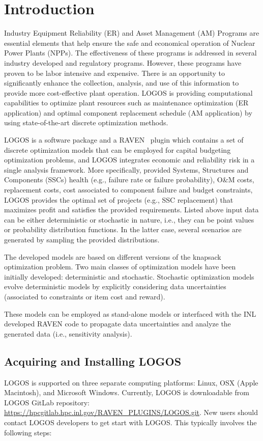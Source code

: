 \section{Introduction}
\label{sec:Introduction}

Industry Equipment Reliability (ER) and Asset Management (AM) Programs are essential elements that
help ensure the safe and economical operation of Nuclear Power Plants (NPPs). The effectiveness of
these programs is addressed in several industry developed and regulatory programs. However, these
programs have proven to be labor intensive and expensive. There is an opportunity to significantly
enhance the collection, analysis, and use of this information to provide more cost-effective plant
operation. LOGOS is providing computational capabilities to optimize plant resources such as
maintenance optimization (ER application) and optimal component replacement schedule (AM application)
by using state-of-the-art discrete optimization methods.

LOGOS is a software package and a RAVEN~\cite{RAVEN,RAVENtheoryMan} plugin which
contains a set of discrete optimization models that can be
employed for capital budgeting optimization problems, and LOGOS integrates economic and reliability
risk in a single analysis framework. More specifically,  provided Systems, Structures and Components
(SSCs) health (e.g., failure rate or failure probability), O\&M costs, replacement costs, cost
associated to component failure and budget constraints, LOGOS provides the optimal set of projects
(e.g., SSC replacement) that maximizes profit and satisfies the provided requirements.
Listed above input data can be either deterministic or stochastic in nature, i.e., they can be point values
or probability distribution functions. In the latter case, several scenarios are generated by
sampling the provided distributions.

The developed models are based on different versions of the knapsack optimization problem.
Two main classes of optimization models have been initially developed: deterministic and stochastic.
Stochastic optimization models evolve deterministic models by explicitly considering data
uncertainties (associated to constraints or item cost and reward).

These models can be employed as stand-alone models or interfaced with the INL developed RAVEN code
to propagate data uncertainties and analyze the generated data (i.e., sensitivity analysis).

\subsection{Acquiring and Installing LOGOS}
LOGOS is supported on three separate computing platforms: Linux, OSX (Apple Macintosh), and Microsoft
Windows. Currently, LOGOS is downloadable from LOGOS GitLab repository:
\url{https://hpcgitlab.hpc.inl.gov/RAVEN_PLUGINS/LOGOS.git}. New users should contact LOGOS developers to
get start with LOGOS. This typically involves the following steps:

